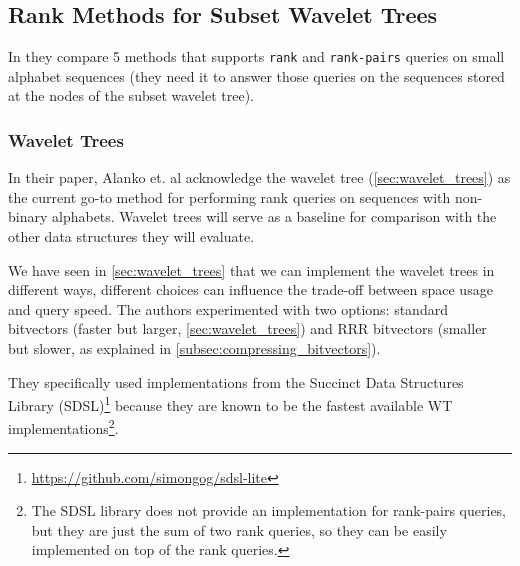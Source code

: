 \subsection{Rank Methods for Subset Wavelet Trees} \label{sec:rank_succint_datastructures}
In \cite{SubsetWT} they compare 5 methods that supports \texttt{rank} and \texttt{rank-pairs} queries on small alphabet sequences (they need it to answer those queries on the sequences stored at the nodes of the subset wavelet tree).

\subsubsection{Wavelet Trees}

In their paper, Alanko et. al acknowledge the wavelet tree (\autoref{sec:wavelet_trees}) as the current go-to method for performing rank queries on sequences with non-binary alphabets. Wavelet trees will serve as a baseline for comparison with the other data structures they will evaluate.

\noindent We have seen in \autoref{sec:wavelet_trees} that we can implement the wavelet trees in different ways, different choices can influence the trade-off between space usage and query speed. The authors experimented with two options: standard bitvectors (faster but larger, \autoref{sec:wavelet_trees}) and RRR bitvectors (smaller but slower, as explained in \autoref{subsec:compressing_bitvectors}).

\noindent They specifically used implementations from the Succinct Data Structures Library (SDSL)\footnote{\url{https://github.com/simongog/sdsl-lite}} because they are known to be the fastest available WT implementations\footnote{The SDSL library does not provide an implementation for rank-pairs queries, but they are just the sum of two rank queries, so they can be easily implemented on top of the rank queries.}.



